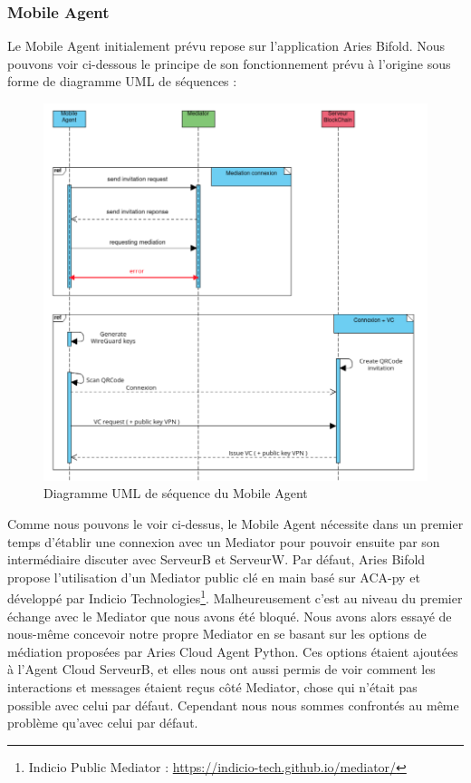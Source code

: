 \documentclass[12pt, openany]{report}
\begin{document}
\subsubsection{Mobile Agent}
\noindent
\begin{flushleft}
Le Mobile Agent initialement prévu repose sur l'application Aries Bifold. Nous pouvons voir ci-dessous le principe de son fonctionnement prévu à l'origine sous forme de diagramme UML de séquences :\\
\begin{figure}[H]
\includegraphics[scale=0.5]{uml-MobileAgent.png}
\centering
\caption{Diagramme UML de séquence du Mobile Agent}
\end{figure}
Comme nous pouvons le voir ci-dessus, le Mobile Agent nécessite dans un premier temps d'établir une connexion avec un Mediator pour pouvoir ensuite par son intermédiaire discuter avec ServeurB et ServeurW. Par défaut, Aries Bifold propose l'utilisation d'un Mediator public clé en main basé sur ACA-py et développé par Indicio Technologies\footnote{Indicio Public Mediator : \url{https://indicio-tech.github.io/mediator/}}. Malheureusement c'est au  niveau du premier échange avec le Mediator que nous avons été bloqué. Nous avons alors essayé de nous-même concevoir notre propre Mediator en se basant sur les options de médiation proposées par Aries Cloud Agent Python. Ces options étaient ajoutées à l'Agent Cloud ServeurB, et elles nous ont aussi permis de voir comment les interactions et messages étaient reçus côté Mediator, chose qui n'était pas possible avec celui par défaut. Cependant nous nous sommes confrontés au même problème qu'avec celui par défaut.\\

\end{flushleft}
\end{document}
